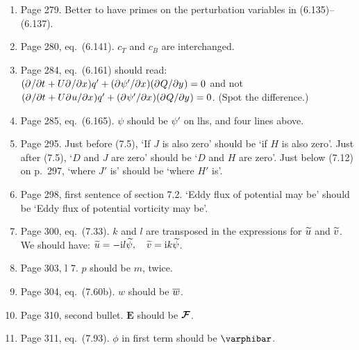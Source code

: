 \documentclass[10pt]{article}
\newcommand{\eq}{eq.\ } \newcommand{\Eq}{Eq.\ }
\begin{document}
\begin{enumerate}


\item Page 279. Better to have primes on the perturbation variables in (6.135)--(6.137). 

\item Page 280, \eq (6.141). $c_T$ and $c_B$ are interchanged.


\item Page 284, \eq (6.161) should read: $({\partial^{}  / \partial t^{}} + U {\partial^{}  / \partial x^{}}) q' + ({\partial^{} \psi' / \partial x^{}})( {\partial^{} Q / \partial y^{}}) = 0 $ and not $({\partial^{}  / \partial t^{}} + U {\partial^{} u / \partial x^{}}) q' + ({\partial^{} \psi' / \partial x^{}}) ( {\partial^{} Q / \partial y^{}} )= 0 $. (Spot the difference.)

\item Page 285, \eq (6.165). $\psi$ should be $\psi'$ on lhs, and four lines above. 
 
\item Page 295. Just before (7.5), `If $J$ is also zero' should be `if $H$ is also zero'. Just after (7.5), `$D$ and $J$ are zero' should be `$D$ and $H$ are zero'. Just below (7.12) on p.\ 297, `where $J'$ is' should be `where $H'$ is'.

\item Page 298, first sentence of section 7.2. `Eddy flux of potential may be' should be `Eddy flux of potential vorticity may be'.

\item Page 300, \eq (7.33). $k$ and $l$ are transposed in the expressions for $\widetilde u$ and $\widetilde v$. We should have:
     $  \widetilde u  =  - \mathrm{i} l \widetilde \psi,  \quad \widetilde v = \mathrm{i} k \widetilde \psi$. 

\item Page 303, l 7. $p$ should be $m$, twice. 

\item Page 304, \eq (7.60b). $w$ should be $\overline w$.

\item Page 310, second bullet. $\bm E$ should be $\bm{\mathcal F}$.

\item Page 311, \eq (7.93). $\phi$ in first term should be $\varphibar$.


\end{enumerate}
\end{document}

